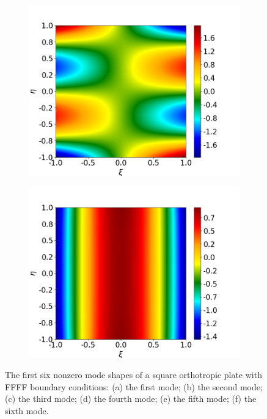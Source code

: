 \documentclass[preprint,12pt]{elsarticle}
\begin{document}
\begin{figure}
\begin{subfigure}[b]{0.49\textwidth}
		\includegraphics[width=\textwidth]{figs/FFFF5.png}
		\caption[]%
		{{\small}}    
		\label{fig:FFF5}
	\end{subfigure}
	\hfill
	\begin{subfigure}[b]{0.49\textwidth}   
		\centering 
		\includegraphics[width=\textwidth]{figs/FFFF6.png}
		\caption[]%
		{{\small }}    
		\label{fig:FFF6}
	\end{subfigure}
	\caption[]  
	{\small The first six nonzero mode shapes of a square orthotropic plate with FFFF boundary conditions: (a) the first mode; (b) the second mode; (c) the third mode; (d) the fourth mode; (e) the fifth mode; (f) the sixth mode.}  
	\label{fig:FFFF}
\end{figure}
\end{document}

